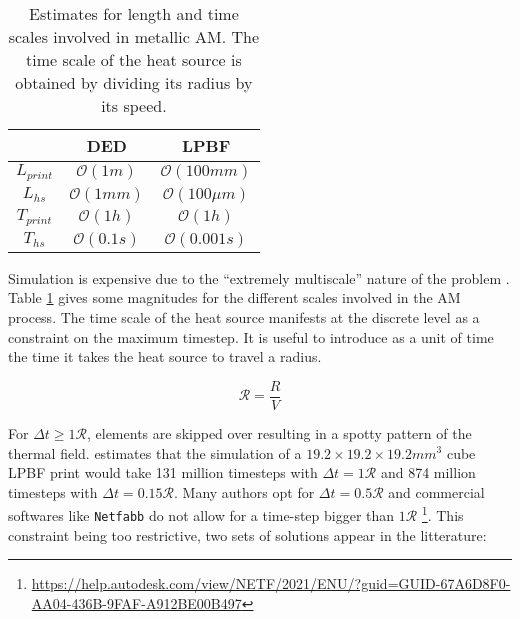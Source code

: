 \par
{}\par
{}\par
{}\par
{}\par
{}\par

\begin{table}[h]
  \centering
  \begin{tabular}{|c|c|c|}
    \hline
    & DED & LPBF \\
    \hline
    $L_{print}$ & $\mathcal{O}(1 m   )$ &  $\mathcal{O}(100 mm    )$  \\
    $L_{hs}$    & $\mathcal{O}(1 mm  )$ &  $\mathcal{O}(100 \mu m)$  \\
    $T_{print}$ & $\mathcal{O}(1 h   )$ &  $\mathcal{O}(1 h       )$  \\
    $T_{hs}$    & $\mathcal{O}(0.1 s )$ &  $\mathcal{O}(0.001 s  )$  \\
    \hline
  \end{tabular}
  \caption{Estimates for length and time scales involved in metallic AM. The time
  scale of the heat source is obtained by dividing its radius by its
  speed.}
  \label{tbl:scales}
\end{table}

Simulation is expensive due to the ``extremely multiscale'' nature
of the problem \cite{Hodge2021}. Table \ref{tbl:scales}
gives some magnitudes for the different scales involved in the AM process.
The time scale of the heat source manifests at the discrete level
as a constraint on the maximum timestep. It is useful to introduce
as a unit of time the time it takes the heat source to travel a radius.

\begin{equation}\label{eq:trad}
\mathcal{R} = \frac{R}{V}
\end{equation}

For $\Delta t \geq 1 \mathcal{R}$, elements are skipped over resulting
in a spotty pattern of the thermal field.
\cite{Hodge2021} estimates that the simulation of a
$19.2 \times 19.2 \times 19.2 mm^3$ cube LPBF print would take 
131 million timesteps with $\Delta t = 1 \mathcal{R}$ and
874 million timesteps with $\Delta t = 0.15 \mathcal{R}$.
Many authors opt for
$\Delta t = 0.5\mathcal{R}$ \cite{Patil2021, Michaleris2014, Stender2018}
and commercial softwares like \texttt{Netfabb}
do not allow for a time-step bigger than $1 \mathcal{R}$
\footnote{\url{https://help.autodesk.com/view/NETF/2021/ENU/?guid=GUID-67A6D8F0-AA04-436B-9FAF-A912BE00B497}}.
This constraint being too restrictive, two sets of solutions
appear in the litterature:

